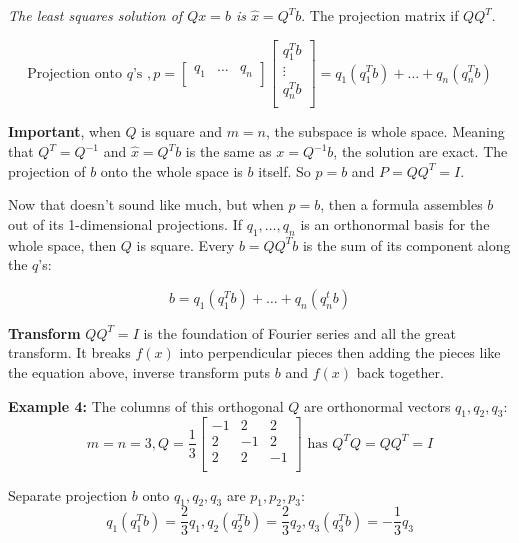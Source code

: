 \emph{The least squares solution of \(Qx = b\) is \(\hat{x} = Q^T b\)}. The projection matrix if \(QQ^T\). 

\[
    \text{Projection onto \(q\)'s }, 
    p = 
    \begin{bmatrix}
        q_1 & \ldots & q_n  \\
    \end{bmatrix}
    \begin{bmatrix}
         q^T_1 b \\
         \vdots \\
         q^T_n b \\
    \end{bmatrix}
    = q_1(q^T_1 b) + \ldots + q_n(q^T_n b)
\]

\textbf{Important}, when \(Q\) is square and \(m = n\), the subspace is whole space. Meaning that \(Q^T = Q^{-1} \) and \(\hat{x} = Q^T b\) is the same as \(x = Q^{-1} b \), the solution are exact. The projection of \(b\) onto the whole space is \(b\) itself. So \(p = b\) and \(P = QQ^T = I\). 

Now that doesn't sound like much, but when \(p = b\), then a formula assembles  \(b\) out of its 1-dimensional projections. If \(q_1, \ldots, q_n\) is an orthonormal basis for the whole space, then \(Q\) is square. Every \(b = QQ^T b\) is the sum of its component along the \(q\)'s:

\[
    b = q_1(q^T_1 b) + \ldots + q_n(q^t_n b)
\]

\textbf{Transform} \(QQ^T = I\) is the foundation of Fourier series and all the great transform. It breaks \(f(x)\) into perpendicular pieces then adding the pieces like the equation above, inverse transform puts \(b\) and \(f(x)\) back together. 

\textbf{Example 4:} The columns of this orthogonal \(Q\) are orthonormal vectors \(q_1, q_2, q_3\):
\[
    m = n = 3, Q = \frac{1}{3}
    \begin{bmatrix}
        -1 & 2 & 2  \\
        2 & -1 & 2  \\
        2 & 2 & -1  \\
    \end{bmatrix}
    \text{ has }
    Q^T Q = Q Q^T = I 
\]   

Separate projection \(b\) onto \(q_1, q_2, q_3\) are \(p_1, p_2, p_3\):
\[
    q_1(q^T_1 b) = \frac{2}{3}q_1 
    , q_2(q^T_2 b) = \frac{2}{3}q_2
    , q_3(q^T_3 b) = -\frac{1}{3}q_3
\]   

